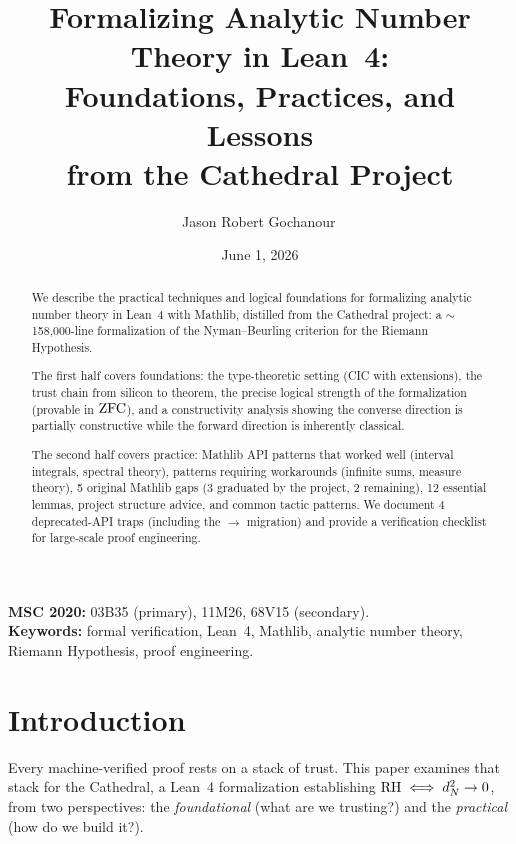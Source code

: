 \documentclass[11pt,a4paper]{article}
\title{%
  Formalizing Analytic Number Theory in Lean~4:\\
  Foundations, Practices, and Lessons\\
  from the Cathedral Project%
}
\author{
  Jason Robert Gochanour\,\orcidlink{0000-0002-2862-526X}
}
\date{June 1, 2026}
\begin{document}
\maketitle

\noindent
\textbf{MSC 2020:} 03B35 (primary), 11M26, 68V15 (secondary).\\
\textbf{Keywords:} formal verification, Lean~4, Mathlib, analytic number theory,
Riemann Hypothesis, proof engineering.

\begin{abstract}
We describe the practical techniques and logical foundations for
formalizing analytic number theory in Lean~4 with Mathlib, distilled
from the Cathedral project: a $\sim$158{,}000-line formalization of the
Nyman--Beurling criterion for the Riemann Hypothesis.

The first half covers foundations: the type-theoretic setting (CIC
with extensions), the trust chain from silicon to theorem, the
precise logical strength of the formalization (provable in $\mathrm{ZFC}$),
and a constructivity analysis showing the converse direction is
partially constructive while the forward direction is inherently
classical.

The second half covers practice: Mathlib API patterns that worked
well (interval integrals, spectral theory), patterns requiring
workarounds (infinite sums, measure theory), 5 original Mathlib gaps
(3 graduated by the project, 2 remaining), 12 essential lemmas,
project structure advice, and common tactic patterns.
We document 4 deprecated-API traps (including the 
$\to$  migration) and provide
a verification checklist for large-scale proof engineering.
\end{abstract}

\tableofcontents

\section{Introduction}
\label{sec:intro}

Every machine-verified proof rests on a stack of trust. This paper
examines that stack for the Cathedral, a Lean~4 formalization
establishing $\mathrm{RH} \iff d_N^2 \to 0$, from two perspectives:
the \emph{foundational} (what are we trusting?) and the
\emph{practical} (how do we build it?).
\end{document}
